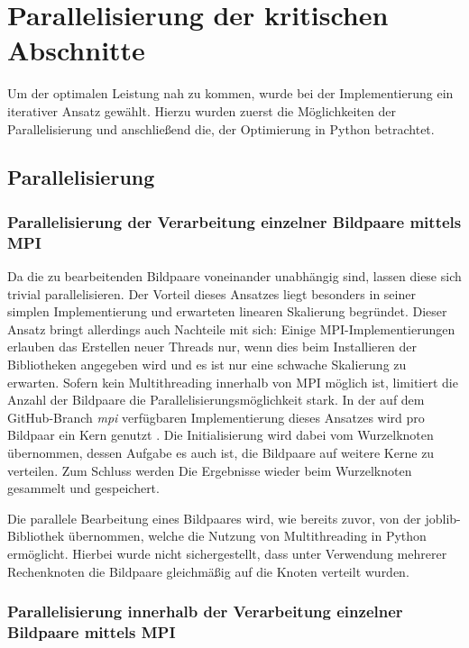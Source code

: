 \chapter{Parallelisierung der kritischen Abschnitte}

Um der optimalen Leistung nah zu kommen, wurde bei der Implementierung ein iterativer Ansatz gewählt. Hierzu wurden zuerst die Möglichkeiten der Parallelisierung und anschließend die, der Optimierung in Python betrachtet. 

\section{Parallelisierung}

\subsection{Parallelisierung der Verarbeitung einzelner Bildpaare mittels MPI}

Da die zu bearbeitenden Bildpaare voneinander unabhängig sind, lassen diese sich trivial parallelisieren. Der Vorteil dieses Ansatzes liegt besonders in seiner simplen Implementierung und erwarteten linearen Skalierung begründet. Dieser Ansatz bringt allerdings auch Nachteile mit sich: Einige \gls{MPI}-Implementierungen erlauben das Erstellen neuer Threads nur, wenn dies beim Installieren der Bibliotheken angegeben wird \cite{OMPI17} und es ist nur eine schwache Skalierung zu erwarten. Sofern kein Multithreading innerhalb von \gls{MPI} möglich ist, limitiert die Anzahl der Bildpaare die Parallelisierungsmöglichkeit stark. In der auf dem GitHub-Branch \textit{mpi} verfügbaren Implementierung dieses Ansatzes wird pro Bildpaar ein Kern genutzt \cite{Coj17}. Die Initialisierung wird dabei vom Wurzelknoten übernommen, dessen Aufgabe es auch ist, die Bildpaare auf weitere Kerne zu verteilen. Zum Schluss werden Die Ergebnisse wieder beim Wurzelknoten gesammelt und gespeichert.

Die parallele Bearbeitung eines Bildpaares wird, wie bereits zuvor, von der joblib-Bibliothek übernommen, welche die Nutzung von Multithreading in Python ermöglicht. Hierbei wurde nicht sichergestellt, dass unter Verwendung mehrerer Rechenknoten die Bildpaare gleichmäßig auf die Knoten verteilt wurden. 

\subsection{Parallelisierung innerhalb der Verarbeitung einzelner Bildpaare mittels MPI}

